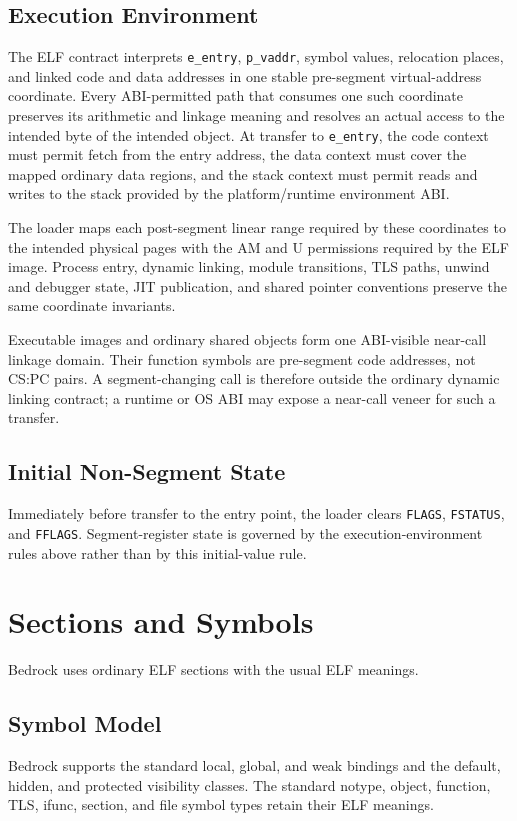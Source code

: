 \documentclass[10pt,twoside]{article}
\begin{document}
\subsection{Execution Environment}
The ELF contract interprets \texttt{e\_entry}, \texttt{p\_vaddr}, symbol
values, relocation places, and linked code and data addresses in one stable
pre-segment virtual-address coordinate. Every ABI-permitted path that consumes
one such coordinate preserves its arithmetic and linkage meaning and resolves
an actual access to the intended byte of the intended object. At transfer to \texttt{e\_entry},
the code context must permit fetch from the entry address, the data context
must cover the mapped ordinary data regions, and the stack context must permit
reads and writes to the stack provided by the platform/runtime environment
ABI.

The loader maps each post-segment linear range required by these coordinates
to the intended physical pages with the AM and U permissions required by the
ELF image. Process entry, dynamic linking, module transitions, TLS paths,
unwind and debugger state, JIT publication, and shared pointer conventions
preserve the same coordinate invariants.

Executable images and ordinary shared objects form one ABI-visible near-call
linkage domain. Their function symbols are pre-segment code addresses, not
CS:PC pairs. A segment-changing call is therefore outside the ordinary dynamic
linking contract; a runtime or OS ABI may expose a near-call veneer for such a
transfer.

\subsection{Initial Non-Segment State}
Immediately before transfer to the entry point, the loader clears
\texttt{FLAGS}, \texttt{FSTATUS}, and \texttt{FFLAGS}. Segment-register state
is governed by the execution-environment rules above rather than by this
initial-value rule.

\clearpage
\section{Sections and Symbols}\label{page:sections-and-symbols}
Bedrock uses ordinary ELF sections with the usual ELF meanings.
\subsection{Symbol Model}
Bedrock supports the standard local, global, and weak bindings and the
default, hidden, and protected visibility classes. The standard notype,
object, function, TLS, ifunc, section, and file symbol types retain their ELF
meanings.
\end{document}
